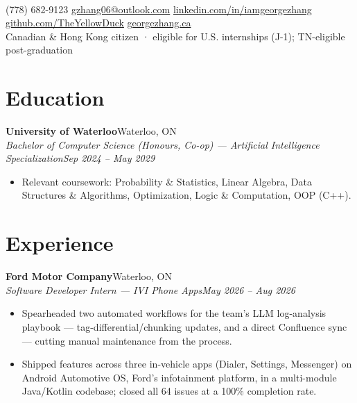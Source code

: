 \documentclass[letterpaper,11pt]{article}
\newcommand{\sep}{\hspace{0.5em}\textcolor{accent!55}{\textbar}\hspace{0.5em}}
\newcommand{\entry}[4]{%
  \textbf{#1}\hfill{\small #2}\\[1pt]%
  {\small\itshape #3}\hfill{\small\itshape #4}\par%
}
\newenvironment{bullets}
  {\begin{itemize}[leftmargin=1.5em,labelsep=0.5em,itemsep=1pt,topsep=1pt,parsep=0pt,partopsep=0pt]\small}
  {\end{itemize}\vspace{1pt}}
\begin{document}
\begin{center}
  {\Huge\bfseries\color{accent}}\\[5pt]
  {\footnotesize
  (778) 682-9123 \sep
  \href{mailto:gzhang06@outlook.com}{gzhang06@outlook.com} \sep
  \href{https://linkedin.com/in/iamgeorgezhang}{linkedin.com/in/iamgeorgezhang} \sep
  \href{https://github.com/TheYellowDuck}{github.com/TheYellowDuck} \sep
  \href{https://georgezhang.ca}{georgezhang.ca}
  \\[3pt]Canadian \& Hong Kong citizen \; · \; eligible for U.S. internships (J-1); TN-eligible post-graduation}
\end{center}

\section{Education}
\entry{University of Waterloo}{Waterloo, ON}{Bachelor of Computer Science (Honours, Co-op) --- Artificial Intelligence Specialization}{Sep 2024 -- May 2029}
\begin{bullets}
  \item Relevant coursework: Probability \& Statistics, Linear Algebra, Data Structures \& Algorithms, Optimization, Logic \& Computation, OOP (C++).
\end{bullets}

\section{Experience}

\entry{Ford Motor Company}{Waterloo, ON}{Software Developer Intern --- IVI Phone Apps}{May 2026 -- Aug 2026}
\begin{bullets}
  \item Spearheaded two automated workflows for the team's LLM log-analysis playbook --- tag-differential/chunking updates, and a direct Confluence sync --- cutting manual maintenance from the process.
  \item Shipped features across three in-vehicle apps (Dialer, Settings, Messenger) on Android Automotive OS, Ford's infotainment platform, in a multi-module Java/Kotlin codebase; closed all 64 issues at a 100\% completion rate.
\end{bullets}
\end{document}
